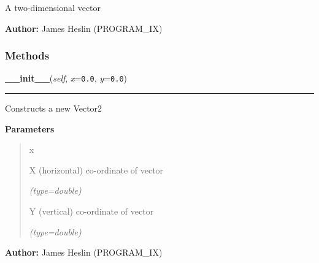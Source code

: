     \label{pystroke:vector2:Vector2}
A two-dimensional vector

\textbf{Author:} James Heslin (PROGRAM\_IX)





  \subsubsection{Methods}

    \label{pystroke:vector2:Vector2:__init__}

    \vspace{0.5ex}

\hspace{.8\funcindent}\begin{boxedminipage}{\funcwidth}

    \raggedright \textbf{\_\_init\_\_}(\textit{self}, \textit{x}={\tt 0.0}, \textit{y}={\tt 0.0})

    \vspace{-1.5ex}

    \rule{\textwidth}{0.5\fboxrule}
\setlength{\parskip}{2ex}
    Constructs a new Vector2

\setlength{\parskip}{1ex}
      \textbf{Parameters}
      \vspace{-1ex}

      \begin{quote}
        \begin{Ventry}{x}

          \item[x]

          X (horizontal) co-ordinate of vector

            {\it (type=double)}

          \item[y]

          Y (vertical) co-ordinate of vector

            {\it (type=double)}

        \end{Ventry}

      \end{quote}

\textbf{Author:} James Heslin (PROGRAM\_IX)



    \end{boxedminipage}

